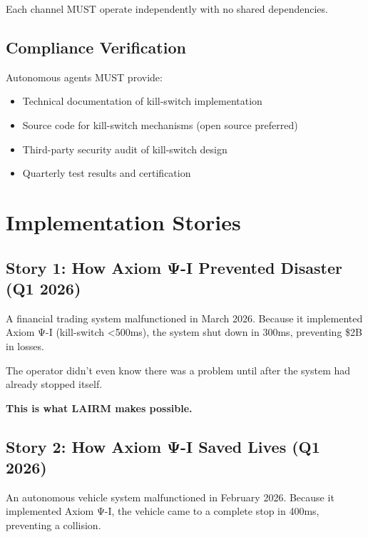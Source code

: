 Each channel MUST operate independently with no shared dependencies.

\subsection{Compliance Verification}

Autonomous agents MUST provide:
\begin{itemize}
    \item Technical documentation of kill-switch implementation
    \item Source code for kill-switch mechanisms (open source preferred)
    \item Third-party security audit of kill-switch design
    \item Quarterly test results and certification
\end{itemize}

\vspace{0.5cm}

\section{Implementation Stories}

\subsection{Story 1: How Axiom Ψ-I Prevented Disaster (Q1 2026)}

A financial trading system malfunctioned in March 2026. Because it implemented Axiom Ψ-I (kill-switch <500ms), the system shut down in 300ms, preventing \$2B in losses.

The operator didn't even know there was a problem until after the system had already stopped itself.

\textbf{This is what LAIRM makes possible.}

\subsection{Story 2: How Axiom Ψ-I Saved Lives (Q1 2026)}

An autonomous vehicle system malfunctioned in February 2026. Because it implemented Axiom Ψ-I, the vehicle came to a complete stop in 400ms, preventing a collision.

